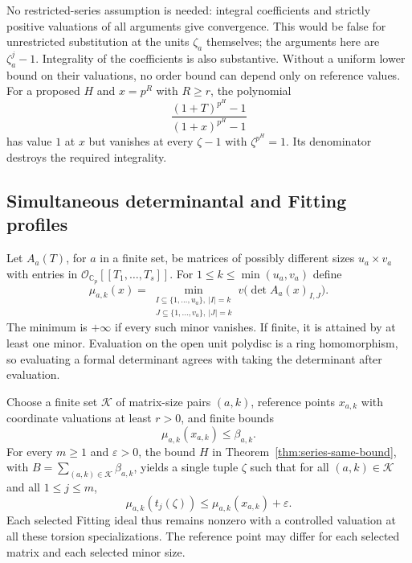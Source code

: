 \begin{remark}
No restricted-series assumption is needed: integral coefficients and
strictly positive valuations of all arguments give convergence.  This would
be false for unrestricted substitution at the units $\zeta_a$ themselves;
the arguments here are $\zeta_a^j-1$.
Integrality of the coefficients is also substantive.  Without a uniform
lower bound on their valuations, no order bound can depend only on reference
values.  For a proposed $H$ and $x=p^R$ with $R\geq r$, the polynomial
\[
 \frac{(1+T)^{p^H}-1}{(1+x)^{p^H}-1}
\]
has value $1$ at $x$ but vanishes at every $\zeta-1$ with
$\zeta^{p^H}=1$.  Its denominator destroys the required integrality.
\end{remark}

\subsection{Simultaneous determinantal and Fitting profiles}
\label{subsec:fitting-profiles}

Let $A_a(T)$, for $a$ in a finite set, be matrices of possibly different
sizes $u_a\times v_a$ with entries in
$\mathcal O_{\mathbb C_p}[[T_1,\ldots,T_s]]$.  For
$1\leq k\leq\min(u_a,v_a)$ define
\[
 \mu_{a,k}(x)=\min_{\substack{I\subseteq\{1,\ldots,u_a\},\ |I|=k\\
                             J\subseteq\{1,\ldots,v_a\},\ |J|=k}}
                 v\bigl(\det A_a(x)_{I,J}\bigr).
\]
The minimum is $+\infty$ if every such minor vanishes.  If finite, it is
attained by at least one minor.  Evaluation on the open unit polydisc is a
ring homomorphism, so evaluating a formal determinant agrees with taking
the determinant after evaluation.

\begin{corollary}
\label{cor:fitting-torsion}
Choose a finite set $\mathcal K$ of matrix-size pairs $(a,k)$, reference
points $x_{a,k}$ with coordinate valuations at least $r>0$, and finite bounds
\[
 \mu_{a,k}(x_{a,k})\leq\beta_{a,k}.
\]
For every $m\geq1$ and $\varepsilon>0$, the bound $H$ in
Theorem~\ref{thm:series-same-bound}, with
$B=\sum_{(a,k)\in\mathcal K}\beta_{a,k}$, yields a single tuple $\zeta$
such that for all $(a,k)\in\mathcal K$ and all $1\leq j\leq m$,
\begin{equation}
 \mu_{a,k}(t_j(\zeta))
 \leq\mu_{a,k}(x_{a,k})+\varepsilon.
 \label{eq:fitting-profile-bound}
\end{equation}
Each selected Fitting ideal thus remains nonzero with a controlled valuation
at all these torsion specializations.  The reference point may differ for
each selected matrix and each selected minor size.
\end{corollary}

